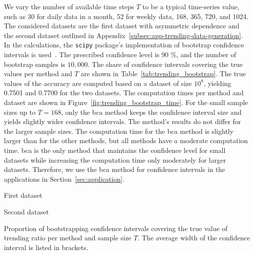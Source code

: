 \documentclass[pdflatex]{sn-jnl}
\theoremstyle{plain}%
\theoremstyle{definition}
\begin{document}
We vary the number of available time steps $T$ to be a typical time-series value, such as 30 for daily data in a month, 52 for weekly data, 168, 365, 720, and 1024.
The considered datasets are the first dataset with asymmetric dependence and the second dataset outlined in Appendix~\ref{subsec:app-trending-data-generation}.
In the calculations, the \verb|scipy| package's implementation of bootstrap confidence intervals is used~\citep{Virtanen2020}.
The prescribed confidence level is 90 \%, and the number of bootstrap samples is $10,000$.
The share of confidence intervals covering the true values per method and $T$ are shown in Table~\ref{tab:trending_bootstrap}.
The true values of the accuracy are computed based on a dataset of size $10^8$, yielding 0.7501 and 0.7700 for the two datasets.
The computation times per method and dataset are shown in Figure~\ref{fig:trending_bootstrap_time}.
For the small sample sizes up to $T = 168$, only the \ac{bca} method keeps the confidence interval size and yields slightly wider confidence intervals.
The method's results do not differ for the larger sample sizes.
The computation time for the \ac{bca} method is slightly larger than for the other methods, but all methods have a moderate computation time.
\Ac{bca} is the only method that maintains the confidence level for small datasets while increasing the computation time only moderately for larger datasets.
Therefore, we use the \ac{bca} method for confidence intervals in the applications in Section~\ref{sec:application}.


\begin{table}
    \centering
    \tiny
    \begin{subtable}{.48\textwidth}
		\centering
        
        \caption{First dataset}
    \end{subtable}\hspace{0.02\textwidth}
    \begin{subtable}{.48\textwidth}
		\centering        
		
        \caption{Second dataset}
    \end{subtable}
    \caption[Proportion of bootstrapping confidence intervals covering the true value of trending ratio per method and sample size $T$ in the bootstrap simulation study.]{Proportion of bootstrapping confidence intervals covering the true value of trending ratio per method and sample size $T$. The average width of the confidence interval is listed in brackets.}
    \label{tab:trending_bootstrap}
\end{table}
\end{document}
